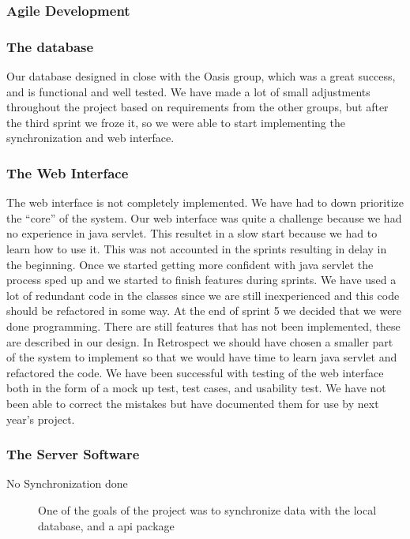 \subsubsection*{Agile Development}

\subsubsection*{The database}
Our database designed in close with the Oasis group, which was a great success, and is functional and well tested. We have made a lot of small adjustments throughout the project based on requirements from the other groups, but after the third sprint we froze it, so we were able to start implementing the synchronization and web interface.

\subsubsection*{The Web Interface}
The web interface is not completely implemented. We have had to down prioritize the ``core'' of the system. 
Our web interface was quite a challenge because we had no experience in java servlet. This resultet in a slow start because we had to learn how to use it. This was not accounted in the sprints resulting in delay in the beginning. Once we started getting more confident with java servlet the process sped up and we started to finish features during sprints.
We have used a lot of redundant code in the classes since we are still inexperienced and this code should be refactored in some way. At the end of sprint 5 we decided that we were done programming. There are still features that has not been implemented, these are described in our design.
In Retrospect we should have chosen a smaller part of the system to implement so that we would have time to learn java servlet and refactored the code. We have been successful with testing of the web interface both in the form of a mock up test, test cases, and usability test.
We have not been able to correct the mistakes but have documented them for use by next year's project.

\subsubsection*{The Server Software}
\begin{description}
 \item[No Synchronization done] One of the goals of the project was to synchronize data with the local database, and a api package 
\end{description}


